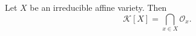 Let $X$ be an irreducible affine variety. Then
$$\mathcal{K}[X] = \bigcap_{x \in X} \mathcal{O}_x.$$
